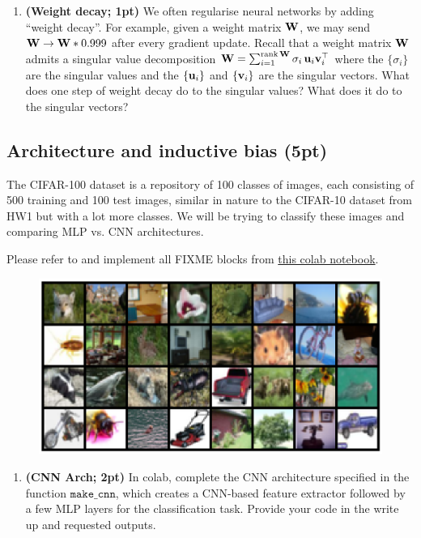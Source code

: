 \documentclass[12pt,letterpaper]{article}
\begin{document}
\begin{enumerate}
    \item \textbf{(Weight decay; 1pt)} We often regularise neural networks by adding ``weight decay''. For example, given a weight matrix ${\mathbf{W}}$, we may send ${\mathbf{W}} \to {\mathbf{W}} * 0.999$ after every gradient update. Recall that a weight matrix ${\mathbf{W}}$ admits a singular value decomposition ${\mathbf{W}} = \sum_{i=1}^{\operatorname{rank}{\mathbf{W}}} \sigma_i \,{\mathbf{u}}_i {\mathbf{v}}_i^\top$ where the $
    \{\sigma_i\}$ are the singular values and the $\{{\mathbf{u}}_i\}$ and $\{{\mathbf{v}}_i\}$ are the singular vectors. What does one step of weight decay do to the singular values? What does it do to the singular vectors?


\end{enumerate}

\newpage
\subsection*{Architecture and inductive bias (5pt)}


The CIFAR-100 dataset is a repository of 100 classes of images, each consisting of 500 training and 100 test images, similar in nature to the CIFAR-10 dataset from HW1 but with a lot more classes. We will be trying to classify these images and comparing MLP vs. CNN architectures.

Please refer to and implement all FIXME blocks from \href{https://colab.research.google.com/drive/1AauIMAD_yUumRL0hNDtuHzeNXwc1AxLg}{this colab notebook}.

\begin{figure}[h]
\centering
    \includegraphics[width=0.75\linewidth]{figure/cifar100.png}
\end{figure}



\begin{enumerate}[resume]
    \item \textbf{(CNN Arch; 2pt)} In colab, complete the CNN architecture specified in the function $\texttt{make\_cnn}$, which creates a CNN-based feature extractor followed by a few MLP layers for the classification task. Provide your code in the write up and requested outputs.
\end{enumerate}
\end{document}
